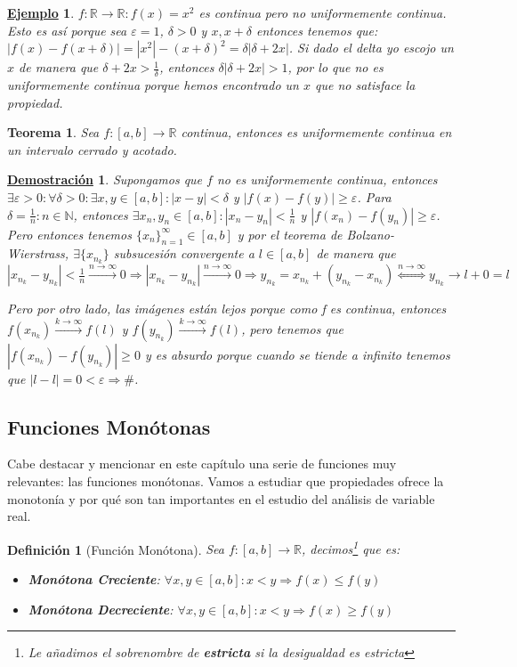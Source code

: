 \documentclass[10pt,a4paper,openright]{book}
\theoremstyle{break}
\newtheorem{defi}{Definición}[chapter]
\newtheorem{theo}{Teorema}[chapter]
\newtheorem*{demo}{\underline{Demostración}}
\newtheorem{ej}{\underline{Ejemplo}}[chapter]
\begin{document}
\begin{ej}
$f: \mathbb R \rightarrow \mathbb R: f(x)=x^2$ es continua pero no uniformemente continua. Esto es así porque sea $\varepsilon=1$, $\delta >0$ y $x,x+\delta$ entonces tenemos que: $|f(x)-f(x+\delta)|=|x^2|-(x+\delta)^2=\delta|\delta +2x|$. Si dado el delta yo escojo un $x$ de manera que $\delta +2x > \frac{1}{\delta}$, entonces $\delta|\delta +2x|>1$, por lo que no es uniformemente continua porque hemos encontrado un $x$ que no satisface la propiedad.
\end{ej}

\begin{theo}
Sea $f:[a,b]\rightarrow \mathbb R$ continua, entonces es uniformemente continua en un intervalo cerrado y acotado.
\end{theo}
\begin{demo}
Supongamos que $f$ no es uniformemente continua, entonces $\exists \varepsilon> 0: \forall \delta>0: \exists x,y\in [a,b]: |x-y|<\delta$ y $|f(x)-f(y)|\geq \varepsilon$. Para $\delta = \frac{1}{n}: n\in \mathbb N$, entonces $\exists x_n, y_n\in [a,b]: |x_n-y_n|<\frac{1}{n}$ y $|f(x_n)-f(y_n)|\geq \varepsilon$. Pero entonces tenemos $\{x_n\}_{n=1}^\infty\in [a,b]$ y por el teorema de Bolzano-Wierstrass, $\exists \{x_{n_k}\}$ subsucesión convergente a $l\in [a,b]$ de manera que $|x_{n_k}-y_{n_k}| < \frac{1}{n} \xrightarrow{n\rightarrow \infty} 0\Rightarrow |x_{n_k}-y_{n_k}|\xrightarrow{n\rightarrow \infty} 0\Rightarrow y_{n_k}=x_{n_k}+(y_{n_k}-x_{n_k})\stackrel{n\rightarrow \infty}{\Leftrightarrow} y_{n_k}\rightarrow l+0=l$

Pero por otro lado, las imágenes están lejos porque como f es continua, entonces $f(x_{n_k})\xrightarrow{k\rightarrow \infty}f(l)$ y $f(y_{n_k})\xrightarrow{k\rightarrow \infty}f(l)$, pero tenemos que $|f(x_{n_k})-f(y_{n_k})|\geq 0$ y es absurdo porque cuando se tiende a infinito tenemos que $|l-l|=0<\varepsilon\Rightarrow \#$.
\end{demo}

\subsection{Funciones Monótonas}
Cabe destacar y mencionar en este capítulo una serie de funciones muy relevantes: las funciones monótonas. Vamos a estudiar que propiedades ofrece la monotonía y por qué son tan importantes en el estudio del análisis de variable real. 

\begin{defi}[Función Monótona]
Sea $f:[a,b]\rightarrow \mathbb R$, decimos\footnote{Le añadimos el sobrenombre de \textbf{estricta} si la desigualdad es estricta} que es:
\begin{itemize}
\item \textbf{Monótona Creciente}: $\forall x,y\in [a,b]: x<y\Rightarrow f(x)\leq f(y)$
\item \textbf{Monótona Decreciente}: $\forall x,y\in [a,b]: x<y\Rightarrow f(x)\geq f(y)$
\end{itemize}
\end{defi}
\end{document}
